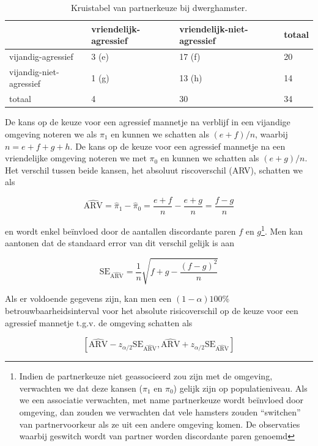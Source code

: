 \documentclass[
  12pt,dutch]{book}
\theoremstyle{definition}
\theoremstyle{definition}
\theoremstyle{definition}
\theoremstyle{definition}
\theoremstyle{remark}
\begin{document}
\begin{table}

\caption{\label{tab:catHamster}Kruistabel van partnerkeuze bij dwerghamster.}
\centering
\begin{tabular}[t]{llll}
\toprule
  & vriendelijk-agressief & vriendelijk-niet-agressief & totaal\\
\midrule
vijandig-agressief & 3 (e) & 17 (f) & 20\\
vijandig-niet-agressief & 1 (g) & 13 (h) & 14\\
totaal & 4 & 30 & 34\\
\bottomrule
\end{tabular}
\end{table}

De kans op de keuze voor een agressief mannetje na verblijf in een vijandige omgeving noteren we als \(\pi_1\) en kunnen we schatten als \((e+f)/n\), waarbij \(n=e+f+g+h\). De kans op
de keuze voor een agressief mannetje na een vriendelijke omgeving noteren we met \(\pi_0\)
en kunnen we schatten als \((e+g)/n\). Het verschil tussen beide kansen,
het absoluut riscoverschil (ARV), schatten we als

\begin{equation*}
\widehat{\text{ARV}}=\hat\pi_1-\hat\pi_0=\frac{e+f}{n}-\frac{e+g}{n}=\frac{f-g}{n}
\end{equation*}

en wordt enkel beïnvloed door de aantallen discordante paren \(f\) en \(g\)\footnote{Indien de partnerkeuze niet geassocieerd zou zijn met de omgeving, verwachten we dat deze kansen (\(\pi_1\) en \(\pi_0\)) gelijk zijn op populatieniveau. Als we een associatie verwachten, met name partnerkeuze wordt beïnvloed door omgeving, dan zouden we verwachten dat vele hamsters zouden ``switchen'' van partnervoorkeur als ze uit een andere omgeving komen. De observaties waarbij geswitch wordt van partner worden discordante paren genoemd}. Men kan aantonen dat de standaard error van dit verschil gelijk is aan

\begin{equation*}
\text{SE}_{\widehat{\text{ARV}}}=\frac{1}{n}\sqrt{f+g-\frac{(f-g)^2}{n}}
\end{equation*}

Als er voldoende gegevens zijn, kan men een \((1-\alpha)100\%\)
betrouwbaarheidsinterval voor het absolute risicoverschil op de keuze voor een agressief mannetje t.g.v. de omgeving schatten
als

\[\left[\widehat{\text{ARV}}-z_{\alpha/2}\text{SE}_{\widehat{\text{ARV}}},\widehat{\text{ARV}}+z_{\alpha/2}\text{SE}_{\widehat{\text{ARV}}}\right]\]
\end{document}

